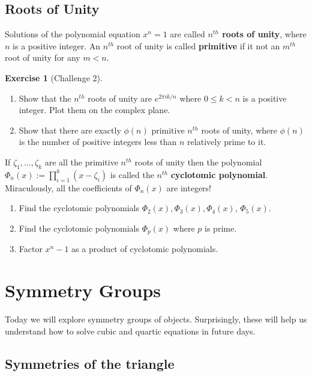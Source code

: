 \documentclass[reqno, 12pt, letter]{article}
\theoremstyle{plain}
\theoremstyle{definition}
\newtheorem{exercise}[theorem]{Exercise}
\theoremstyle{remark}
\numberwithin{equation}{section}
\begin{document}
	
	
	
	
	
	\subsection{Roots of Unity}
		Solutions of the polynomial equation $ x^n = 1$ are called \textbf{$n^{th}$ roots of unity}, where $ n$ is a positive integer. An $ n^{th}$ root of unity is called \textbf{primitive} if it not an $ m^{th}$ root of unity for any $ m < n$.
	
	\begin{exercise}[Challenge 2] $ $
		\begin{enumerate}
			\item Show that the $ n^{th}$ roots of unity are $ e^{2 \pi i k / n}$ where $ 0 \le k < n$ is a positive integer. Plot them on the complex plane. 
			\item Show that there are exactly $ \phi(n)$ primitive $ n^{th}$ roots of unity, where $ \phi(n)$ is the number of positive integers less than $ n$ relatively prime to it.
		\end{enumerate}
		If $ \zeta_1, \dots, \zeta_k$ are all the primitive $ n^{th}$ roots of unity then the polynomial $ \Phi_n(x) := \prod _{i=1}^k (x - \zeta_i)$ is called the $ n^{th}$ \textbf{cyclotomic polynomial}. Miraculously, all the coefficients of $ \Phi_n(x)$ are integers!
		\begin{enumerate}[resume]
			\item Find the cyclotomic polynomials $ \Phi_2(x), \Phi_3(x), \Phi_4(x)$, $ \Phi_5(x)$.
			\item Find the cyclotomic polynomials $ \Phi_p(x)$ where $ p$ is prime.
			\item Factor $ x^n - 1$ as a product of cyclotomic polynomials.
		\end{enumerate}
	\end{exercise}
	

\newpage
\section{Symmetry Groups}

Today we will explore symmetry groups of objects. Surprisingly, these will help us understand
how to solve cubic and quartic equations in future days.

\subsection{Symmetries of the triangle}
\end{document}
